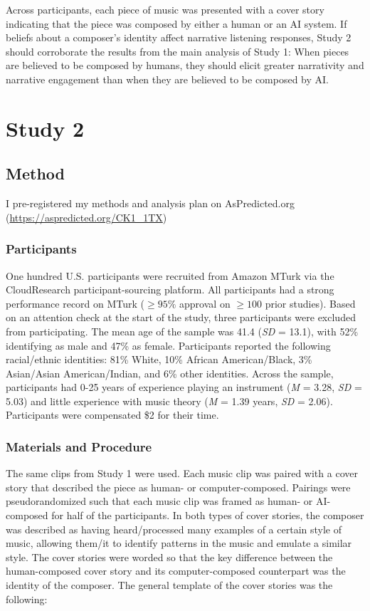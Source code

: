 \documentclass[12pt,twoside]{reedthesis}
\begin{document}
Across participants, each piece of music was presented with a cover story indicating that the piece was composed by either a human or an AI system. If beliefs about a composer’s identity affect narrative listening responses, Study 2 should corroborate the results from the main analysis of Study 1: When pieces are believed to be composed by humans, they should elicit greater narrativity and narrative engagement than when they are believed to be composed by AI. 

\chapter*{Study 2}

\section*{Method}
I pre-registered my methods and analysis plan on AsPredicted.org (\url{https://aspredicted.org/CK1_1TX})
\subsection*{Participants}

One hundred U.S. participants were recruited from Amazon MTurk via the CloudResearch participant-sourcing platform. All participants had a strong performance record on MTurk ($\ge95\%$ approval on $\ge100$ prior studies). Based on an attention check at the start of the study, three participants were excluded from participating. The mean age of the sample was 41.4 (\emph{SD} = 13.1), with 52\% identifying as male and 47\% as female. Participants reported the following racial/ethnic identities: 81\% White, 10\% African American/Black, 3\% Asian/Asian American/Indian, and 6\% other identities. Across the sample, participants had 0-25 years of experience playing an instrument (\emph{M} = 3.28, \emph{SD} = 5.03) and little experience with music theory (\emph{M} = 1.39 years, \emph{SD} = 2.06). Participants were compensated \$2 for their time. 

\subsection*{Materials and Procedure}

The same clips from Study 1 were used. Each music clip was paired with a cover story that described the piece as human- or computer-composed. Pairings were pseudorandomized such that each music clip was framed as human- or AI-composed for half of the participants. In both types of cover stories, the composer was described as having heard/processed many examples of a certain style of music, allowing them/it to identify patterns in the music and emulate a similar style. The cover stories were worded so that the key difference between the human-composed cover story and its computer-composed counterpart was the identity of the composer. The general template of the cover stories was the following:
\\
\end{document}
